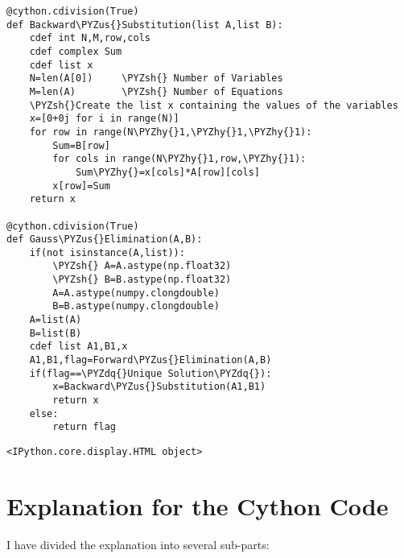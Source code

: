 \documentclass[11pt]{article}
\makeatletter
\def\PYZus{\char`\_}
\def\PYZsh{\char`\#}
\def\PYZhy{\char`\-}
\def\PYZdq{\char`\"}
\newcommand{\boxspacing}{\kern\kvtcb@left@rule\kern\kvtcb@boxsep}
\newcommand{\prompt}[4]{
        {\ttfamily\llap{{\color{#2}[#3]:\hspace{3pt}#4}}\vspace{-\baselineskip}}
    }
\makeatother
\begin{document}
\begin{tcolorbox}[breakable, size=fbox, boxrule=1pt, pad at break*=1mm,colback=cellbackground, colframe=cellborder]
\begin{Verbatim}[commandchars=\\\{\}]
@cython.cdivision(True)
def Backward\PYZus{}Substitution(list A,list B):
    cdef int N,M,row,cols
    cdef complex Sum
    cdef list x
    N=len(A[0])     \PYZsh{} Number of Variables
    M=len(A)        \PYZsh{} Number of Equations
    \PYZsh{}Create the list x containing the values of the variables
    x=[0+0j for i in range(N)]
    for row in range(N\PYZhy{}1,\PYZhy{}1,\PYZhy{}1):
        Sum=B[row]
        for cols in range(N\PYZhy{}1,row,\PYZhy{}1):
            Sum\PYZhy{}=x[cols]*A[row][cols]
        x[row]=Sum
    return x

@cython.cdivision(True)
def Gauss\PYZus{}Elimination(A,B):
    if(not isinstance(A,list)):
        \PYZsh{} A=A.astype(np.float32)
        \PYZsh{} B=B.astype(np.float32)
        A=A.astype(numpy.clongdouble)
        B=B.astype(numpy.clongdouble)
    A=list(A)
    B=list(B)
    cdef list A1,B1,x
    A1,B1,flag=Forward\PYZus{}Elimination(A,B)
    if(flag==\PYZdq{}Unique Solution\PYZdq{}):
        x=Backward\PYZus{}Substitution(A1,B1)
        return x
    else:
        return flag
\end{Verbatim}
\end{tcolorbox}

            \begin{tcolorbox}[breakable, size=fbox, boxrule=.5pt, pad at break*=1mm, opacityfill=0]
\prompt{Out}{outcolor}{5}{\boxspacing}
\begin{Verbatim}[commandchars=\\\{\}]
<IPython.core.display.HTML object>
\end{Verbatim}
\end{tcolorbox}
        
    \hypertarget{explanation-for-the-cython-code}{%
\section{Explanation for the Cython
Code}\label{explanation-for-the-cython-code}}

I have divided the explanation into several sub-parts:
\end{document}

